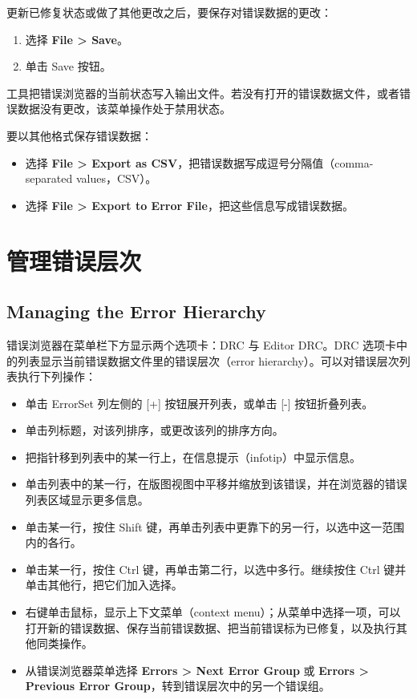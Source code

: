 更新已修复状态或做了其他更改之后，要保存对错误数据的更改：
\begin{enumerate}
  \item 选择 \textbf{File > Save}。
  \item 单击 Save 按钮。
\end{enumerate}

工具把错误浏览器的当前状态写入输出文件。若没有打开的错误数据文件，或者错误数据没有更改，该菜单操作处于禁用状态。

要以其他格式保存错误数据：
\begin{itemize}
  \item 选择 \textbf{File > Export as CSV}，把错误数据写成逗号分隔值（comma-separated values，CSV）。
  \item 选择 \textbf{File > Export to Error File}，把这些信息写成错误数据。
\end{itemize}

\section{管理错误层次}
\subsection*{Managing the Error Hierarchy}

错误浏览器在菜单栏下方显示两个选项卡：DRC 与 Editor DRC。DRC 选项卡中的列表显示当前错误数据文件里的错误层次（error hierarchy）。可以对错误层次列表执行下列操作：
\begin{itemize}
  \item 单击 ErrorSet 列左侧的 [+] 按钮展开列表，或单击 [-] 按钮折叠列表。
  \item 单击列标题，对该列排序，或更改该列的排序方向。
  \item 把指针移到列表中的某一行上，在信息提示（infotip）中显示信息。
  \item 单击列表中的某一行，在版图视图中平移并缩放到该错误，并在浏览器的错误列表区域显示更多信息。
  \item 单击某一行，按住 Shift 键，再单击列表中更靠下的另一行，以选中这一范围内的各行。
  \item 单击某一行，按住 Ctrl 键，再单击第二行，以选中多行。继续按住 Ctrl 键并单击其他行，把它们加入选择。
  \item 右键单击鼠标，显示上下文菜单（context menu）；从菜单中选择一项，可以打开新的错误数据、保存当前错误数据、把当前错误标为已修复，以及执行其他同类操作。
  \item 从错误浏览器菜单选择 \textbf{Errors > Next Error Group} 或 \textbf{Errors > Previous Error Group}，转到错误层次中的另一个错误组。
\end{itemize}

